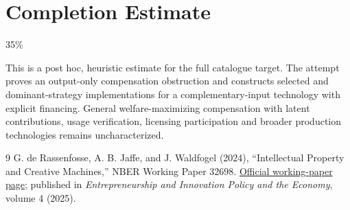 \documentclass[11pt]{article}
\theoremstyle{definition}
\begin{document}
\section{Completion Estimate}
35\%

This is a post hoc, heuristic estimate for the full catalogue target.
The attempt proves an output-only compensation obstruction and constructs selected and dominant-strategy implementations for a complementary-input technology with explicit financing. General welfare-maximizing compensation with latent contributions, usage verification, licensing participation and broader production technologies remains uncharacterized.

\begin{thebibliography}{9}
 G. de Rassenfosse, A. B. Jaffe, and J. Waldfogel (2024), ``Intellectual Property and Creative Machines,'' NBER Working Paper 32698. \href{https://www.nber.org/papers/w32698}{Official working-paper page}; published in \emph{Entrepreneurship and Innovation Policy and the Economy}, volume 4 (2025).
\end{thebibliography}
\end{document}
